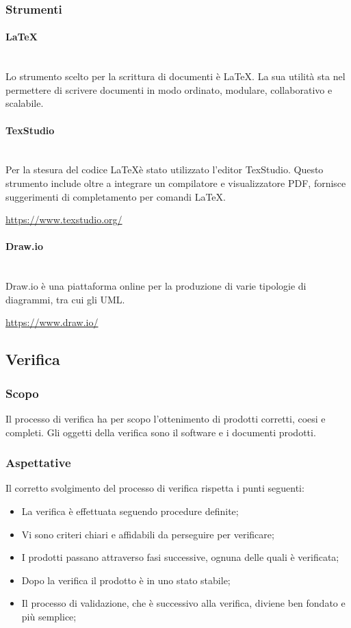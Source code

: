 		\subsubsection{Strumenti}
		\paragraph{\LaTeX} \mbox{}\\
		Lo strumento scelto per la scrittura di documenti è \LaTeX. La sua utilità sta nel permettere di scrivere documenti in modo ordinato, modulare, collaborativo e scalabile.
		\paragraph{TexStudio} \mbox{}\\
		Per la stesura del codice \LaTeX è stato utilizzato l'editor TexStudio. Questo strumento include oltre a integrare un compilatore e visualizzatore PDF, fornisce suggerimenti di completamento per comandi \LaTeX{}. \newline
		\centerline{\url{https://www.texstudio.org/}}
		\paragraph{Draw.io} \mbox{}\\
		Draw.io è una piattaforma online per la produzione di varie tipologie di diagrammi, tra cui gli UML. \newline
		\centerline{\url{https://www.draw.io/}}
	\subsection{Verifica}
		\subsubsection{Scopo}
		Il processo di verifica ha per scopo l'ottenimento di prodotti corretti, coesi e completi. Gli oggetti della verifica sono il software e i documenti prodotti. 
		\subsubsection{Aspettative}
		Il corretto svolgimento del processo di verifica rispetta i punti seguenti:	
		\begin{itemize}
			\item La verifica è effettuata seguendo procedure definite;
			\item Vi sono criteri chiari e affidabili da perseguire per verificare;
			\item I prodotti passano attraverso fasi successive, ognuna delle quali è verificata;
			\item Dopo la verifica il prodotto è in uno stato stabile;
			\item Il processo di validazione, che è successivo alla verifica, diviene ben fondato e più semplice;
		\end{itemize}
